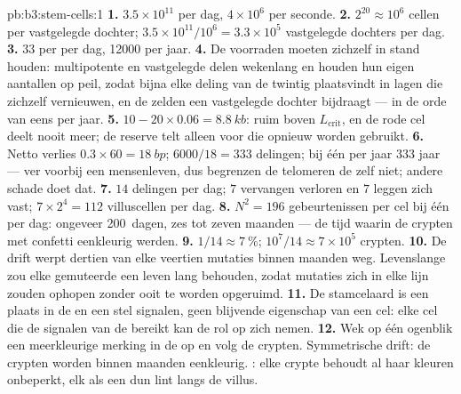 \begin{solution}{pb:b3:stem-cells:1}
\textbf{1.} $3.5\times 10^{11}$ per dag, $4\times 10^{6}$ per seconde.
\textbf{2.} $2^{20} \approx 10^{6}$ cellen per vastgelegde dochter;
$3.5\times 10^{11}/10^{6} = 3.3\times 10^{5}$ vastgelegde dochters per dag.
\textbf{3.} $33$ per  per dag, \num{12000} per jaar.
\textbf{4.} De voorraden  moeten zichzelf in stand
houden: multipotente en vastgelegde  delen wekenlang en
houden hun eigen aantallen op peil, zodat bijna elke deling van de
twintig plaatsvindt in lagen die zichzelf vernieuwen, en de 
zelden een vastgelegde dochter bijdraagt --- in de orde van eens per
jaar.
\textbf{5.} $10 - 20\times 0.06 = \qty{8.8}{kb}$: ruim boven
$L_{\text{crit}}$, en de rode cel deelt nooit meer; de reserve telt
alleen voor  die opnieuw worden gebruikt.
\textbf{6.} Netto verlies $0.3\times 60 = \qty{18}{bp}$; $6000/18 = 333$
delingen; bij één per jaar $333$ jaar --- ver voorbij een mensenleven,
dus begrenzen de telomeren de  zelf niet; andere schade doet dat.
\textbf{7.} $14$ delingen per dag; $7$ vervangen verloren  en
$7$ leggen zich vast; $7\times 2^{4} = 112$ villuscellen per dag.
\textbf{8.} $N^{2} = 196$ gebeurtenissen per cel bij één per dag:
ongeveer \qty{200}{dagen}, zes tot zeven maanden --- de tijd waarin de
crypten met confetti eenkleurig werden.
\textbf{9.} $1/14 \approx \qty{7}{\%}$; $10^{7}/14 \approx 7\times 10^{5}$
crypten.
\textbf{10.} De drift werpt dertien van elke veertien mutaties binnen
maanden weg. Levenslange  zou elke gemuteerde
 een leven lang behouden, zodat mutaties zich in elke lijn
zouden ophopen zonder ooit te worden opgeruimd.
\textbf{11.} De stamcelaard is een plaats in de  en een stel
signalen, geen blijvende eigenschap van een cel: elke cel die de
signalen van de  bereikt kan de rol op zich nemen.
\textbf{12.} Wek op één ogenblik een meerkleurige merking in de
 op en volg de crypten. Symmetrische drift: de crypten worden
binnen maanden eenkleurig. : elke crypte behoudt al
haar kleuren onbeperkt, elk als een dun lint langs de villus.

\end{solution}
